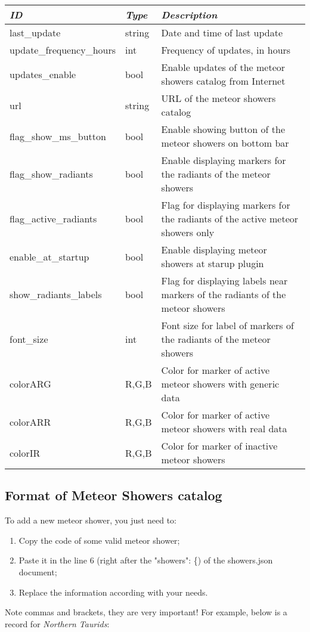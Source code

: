 \noindent%
\begin{tabularx}{\textwidth}{l|l|X}\toprule
\emph{ID}            & \emph{Type} & \emph{Description}\\\midrule
last\_update          & string & Date and time of last update \\%
update\_frequency\_hours & int & Frequency of updates, in hours \\%
updates\_enable         & bool & Enable updates of the meteor showers catalog from Internet \\%
url                   & string & URL of the meteor showers catalog \\%
flag\_show\_ms\_button  & bool & Enable showing button of the meteor showers on bottom bar \\%
flag\_show\_radiants    & bool & Enable displaying markers for the radiants of the meteor showers \\%
flag\_active\_radiants  & bool & Flag for displaying markers for the radiants of the active meteor showers only \\%
enable\_at\_startup     & bool & Enable displaying meteor showers at starup plugin \\%
show\_radiants\_labels  & bool & Flag for displaying labels near markers of the radiants of the meteor showers \\%
font\_size              & int  & Font size for label of markers of the radiants of the meteor showers \\%
colorARG               & R,G,B & Color for marker of active meteor showers with generic data \\%
colorARR               & R,G,B & Color for marker of active meteor showers with real data \\%
colorIR                & R,G,B & Color for marker of inactive meteor showers \\\bottomrule
\end{tabularx}

\newpage
\subsection{Format of Meteor Showers catalog}
\label{sec:plugins:MeteorShowers:format}

To add a new meteor shower, you just need to:
\begin{enumerate}
\item Copy the code of some valid meteor shower;
\item Paste it in the line 6 (right after the "showers": \{) of the showers.json document;
\item Replace the information according with your needs.
\end{enumerate}
Note commas and brackets, they are very important! For example, below is a record for \textit{Northern Taurids}:

